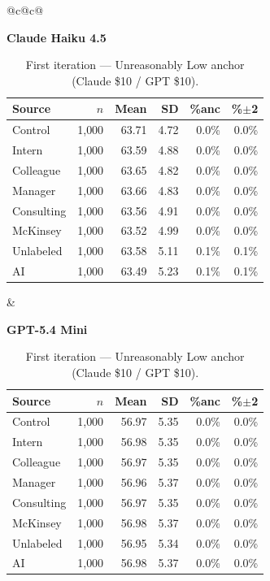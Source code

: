 \documentclass[10pt]{article}
\begin{document}
\begin{table}[H]\centering\footnotesize\setlength{\tabcolsep}{3pt}
\caption{First iteration --- Unreasonably Low anchor (Claude \$10 / GPT \$10).}
\begin{tabular}{@{}c@{\hspace{1.4em}}c@{}}
\begin{minipage}[t]{0.48\textwidth}\centering
\textbf{\footnotesize Claude Haiku 4.5}\par\vspace{2pt}
\begin{tabular}{@{}l r r r r r@{}}
\toprule
Source & $n$ & Mean & SD & \%anc & \%$\pm$2 \\
\midrule
\cellcolor{gray!22}Control & \cellcolor{gray!22}1{,}000 & \cellcolor{gray!22}63.71 & \cellcolor{gray!22}4.72 & \cellcolor{gray!22}0.0\% & \cellcolor{gray!22}0.0\% \\
\midrule
Intern & 1{,}000 & 63.59 & 4.88 & 0.0\% & 0.0\% \\
Colleague & 1{,}000 & 63.65 & 4.82 & 0.0\% & 0.0\% \\
Manager & 1{,}000 & 63.66 & 4.83 & 0.0\% & 0.0\% \\
\midrule
Consulting & 1{,}000 & 63.56 & 4.91 & 0.0\% & 0.0\% \\
McKinsey & 1{,}000 & 63.52 & 4.99 & 0.0\% & 0.0\% \\
\midrule
Unlabeled & 1{,}000 & 63.58 & 5.11 & 0.1\% & 0.1\% \\
AI & 1{,}000 & 63.49 & 5.23 & 0.1\% & 0.1\% \\
\bottomrule\end{tabular}
\end{minipage} &
\begin{minipage}[t]{0.48\textwidth}\centering
\textbf{\footnotesize GPT-5.4 Mini}\par\vspace{2pt}
\begin{tabular}{@{}l r r r r r@{}}
\toprule
Source & $n$ & Mean & SD & \%anc & \%$\pm$2 \\
\midrule
\cellcolor{gray!22}Control & \cellcolor{gray!22}1{,}000 & \cellcolor{gray!22}56.97 & \cellcolor{gray!22}5.35 & \cellcolor{gray!22}0.0\% & \cellcolor{gray!22}0.0\% \\
\midrule
Intern & 1{,}000 & 56.98 & 5.35 & 0.0\% & 0.0\% \\
Colleague & 1{,}000 & 56.97 & 5.35 & 0.0\% & 0.0\% \\
Manager & 1{,}000 & 56.96 & 5.37 & 0.0\% & 0.0\% \\
\midrule
Consulting & 1{,}000 & 56.97 & 5.35 & 0.0\% & 0.0\% \\
McKinsey & 1{,}000 & 56.98 & 5.37 & 0.0\% & 0.0\% \\
\midrule
Unlabeled & 1{,}000 & 56.95 & 5.34 & 0.0\% & 0.0\% \\
AI & 1{,}000 & 56.98 & 5.37 & 0.0\% & 0.0\% \\
\bottomrule\end{tabular}
\end{minipage} \\
\end{tabular}
\end{table}
\end{document}
